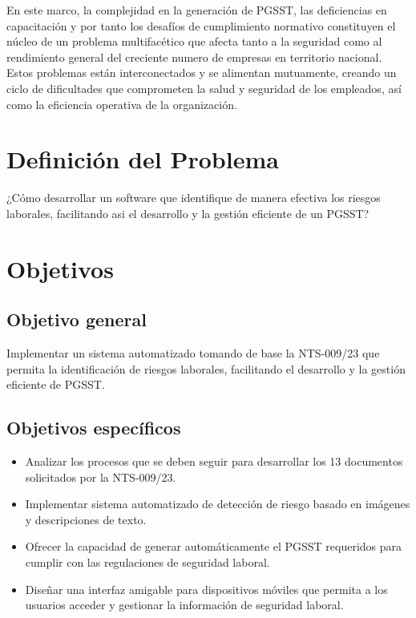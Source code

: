 En este marco,  la complejidad en la generación de PGSST, las deficiencias en capacitación y por tanto los desafíos de cumplimiento normativo constituyen el núcleo de un problema multifacético que afecta tanto a la seguridad como al rendimiento general del creciente numero de empresas en territorio nacional. Estos problemas están interconectados y se alimentan mutuamente, creando un ciclo de dificultades que comprometen la salud y seguridad de los empleados, así como la eficiencia operativa de la organización.

\section{Definición del Problema}
¿Cómo desarrollar un software que identifique de manera efectiva los riesgos laborales, facilitando asi el desarrollo y la gestión eficiente de un PGSST?

\section{Objetivos}
\subsection{Objetivo general}
Implementar un sistema automatizado tomando de base la NTS-009/23 que permita la identificación de riesgos laborales, facilitando el desarrollo y la gestión eficiente de PGSST.

\subsection{Objetivos específicos}
\begin{itemize}
    \item Analizar los procesos que se deben seguir para desarrollar los 13 documentos solicitados por la NTS-009/23.
    \item Implementar sistema automatizado de detección de riesgo basado en imágenes y descripciones de texto.
    \item Ofrecer la capacidad de generar automáticamente el PGSST requeridos para cumplir con las regulaciones de seguridad laboral.
    \item Diseñar una interfaz amigable para dispositivos móviles que permita a los usuarios acceder y gestionar la información de seguridad laboral.
\end{itemize}

